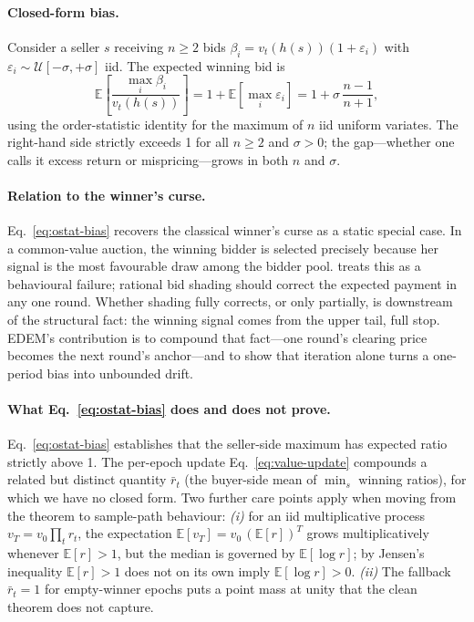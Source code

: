 \documentclass{article}
\begin{document}
\paragraph{Closed-form bias.}
Consider a seller $s$ receiving $n \ge 2$ bids $\beta_i = v_t(h(s))(1+\varepsilon_i)$ with $\varepsilon_i \sim \mathcal{U}[-\sigma, +\sigma]$ iid. The expected winning bid is
\begin{equation}
\label{eq:ostat-bias}
\mathbb{E}\!\left[\frac{\max_i \beta_i}{v_t(h(s))}\right]
= 1 + \mathbb{E}\!\left[\max_i \varepsilon_i\right]
= 1 + \sigma\,\frac{n-1}{n+1},
\end{equation}
using the order-statistic identity for the maximum of $n$ iid
uniform variates. The right-hand side strictly exceeds 1 for all
$n \ge 2$ and $\sigma > 0$; the gap---whether one calls it excess
return or mispricing---grows in both $n$ and $\sigma$.

\paragraph{Relation to the winner's curse.}
Eq.~\eqref{eq:ostat-bias} recovers the classical winner's curse as
a static special case. In a common-value auction, the winning
bidder is selected precisely because her signal is the most
favourable draw among the bidder pool. \citet{thaler1988winners}
treats this as a behavioural failure; rational bid shading should
correct the expected payment in any one round. Whether shading
fully corrects, or only partially, is downstream of the structural
fact: the winning signal comes from the upper tail, full stop.
EDEM's contribution is to compound that fact---one round's
clearing price becomes the next round's anchor---and to show that
iteration alone turns a one-period bias into unbounded drift.

\paragraph{What Eq.~\eqref{eq:ostat-bias} does and does not prove.}
Eq.~\eqref{eq:ostat-bias} establishes that the seller-side maximum
has expected ratio strictly above 1. The per-epoch update
Eq.~\eqref{eq:value-update} compounds a related but distinct
quantity $\bar r_t$ (the buyer-side mean of $\min_s$ winning
ratios), for which we have no closed form. Two further care points
apply when moving from the theorem to sample-path behaviour:
\emph{(i)} for an iid multiplicative process $v_T = v_0\prod_t r_t$,
the expectation $\mathbb{E}[v_T] = v_0\,(\mathbb{E}[r])^T$ grows
multiplicatively whenever $\mathbb{E}[r]>1$, but the median is
governed by $\mathbb{E}[\log r]$; by Jensen's inequality
$\mathbb{E}[r]>1$ does not on its own imply
$\mathbb{E}[\log r]>0$. \emph{(ii)} The fallback $\bar r_t = 1$ for
empty-winner epochs puts a point mass at unity that the clean
theorem does not capture.
\end{document}
